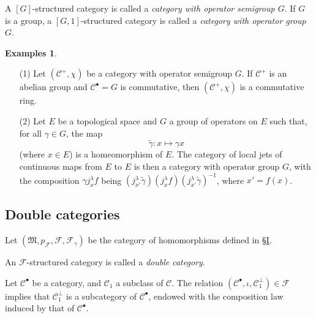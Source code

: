 \documentclass[a4paper,fleqn]{article}
\theoremstyle{plain}
\newenvironment{proposition}[1]
  {\renewcommand\theinnerproposition{#1}\innerproposition}
  {\endinnerproposition}
\theoremstyle{definition}
\newenvironment{definition}[1]
  {\renewcommand\theinnerdefinition{#1}\innerdefinition}
  {\endinnerdefinition}
\newtheorem*{examples}{Examples}
\newcommand{\oldpage}[1]{{\marginpar{\footnotesize$\bigg\vert$\,\,\,\,\textit{p.~#1}}}}
\newcommand{\CC}{\mathcal{C}}
\newcommand{\MM}{\mathfrak{M}}
\newcommand{\FF}{\mathcal{F}}
\begin{document}
\oldpage{389}

\begin{definition}{9}
\label{definition:ii-9}
  A $[G]$-structured category is called a \emph{category with operator semigroup $G$}.
  If $G$ is a group, a $[G,1]$-structured category is called a \emph{category with operator group $G$}.
\end{definition}

\begin{examples}
  \begin{enumerate}
    \item[\normalfont(1)]
      Let $(\CC^+,\chi)$ be a category with operator semigroup $G$.
      If $\CC^+$ is an abelian group and $\CC^\bullet=G$ is commutative, then $(\CC^+,\chi)$ is a commutative ring.
    \item[\normalfont(2)]
      Let $E$ be a topological space and $G$ a group of operators on $E$ such that, for all $\gamma\in G$, the map
      \[
        \widetilde{\gamma}\colon x
        \longmapsto \gamma x
      \]
      (where $x\in E$) is a homeomorphism of $E$.
      The category of local jets of continuous maps from $E$ to $E$ is then a category with operator group $G$, with the composition $\gamma j_x^\lambda f$ being $(j_{x'}^\lambda\widetilde{\gamma})(j_x^\lambda f)(j_{x'}^\lambda\widetilde{\gamma})^{-1}$, where $x'=f(x)$.
  \end{enumerate}
\end{examples}


\subsection{Double categories}
\label{section:ii-4}

Let $(\MM,p_\FF,\FF,\FF_\gamma)$ be the category of homomorphisms defined in \hyperref[section:i]{§I}.

\begin{definition}{10}
\label{definition:ii-10}
  An $\FF$-structured category is called a \emph{double category}.
\end{definition}

\begin{proposition}{9}
\label{proposition:ii-9}
  Let $\CC^\bullet$ be a category, and $\CC_1$ a subclass of $\CC$.
  The relation $(\CC^\bullet,\iota,\CC_1^\perp)\in\FF$ implies that $\CC_1^\perp$ is a subcategory of $\CC^\bullet$, endowed with the composition law induced by that of $\CC^\bullet$.
\end{proposition}
\end{document}
